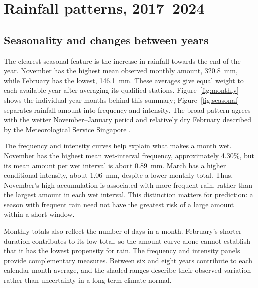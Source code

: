 \section{Rainfall patterns, 2017--2024}

\subsection{Seasonality and changes between years}

The clearest seasonal feature is the increase in rainfall towards the end of the year. November has the highest mean observed monthly amount, 320.8~mm, while February has the lowest, 146.1~mm. These averages give equal weight to each available year after averaging its qualified stations. Figure~\ref{fig:monthly} shows the individual year-months behind this summary; Figure~\ref{fig:seasonal} separates rainfall amount into frequency and intensity. The broad pattern agrees with the wetter November--January period and relatively dry February described by the Meteorological Service Singapore \cite{climate}.


The frequency and intensity curves help explain what makes a month wet. November has the highest mean wet-interval frequency, approximately 4.30\%, but its mean amount per wet interval is about 0.89~mm. March has a higher conditional intensity, about 1.06~mm, despite a lower monthly total. Thus, November's high accumulation is associated with more frequent rain, rather than the largest amount in each wet interval. This distinction matters for prediction: a season with frequent rain need not have the greatest risk of a large amount within a short window.


Monthly totals also reflect the number of days in a month. February's shorter duration contributes to its low total, so the amount curve alone cannot establish that it has the lowest propensity for rain. The frequency and intensity panels provide complementary measures. Between six and eight years contribute to each calendar-month average, and the shaded ranges describe their observed variation rather than uncertainty in a long-term climate normal.

